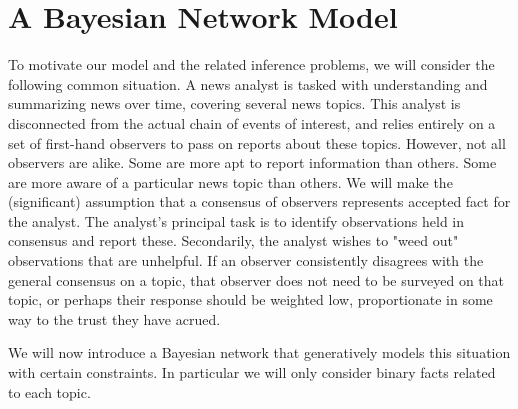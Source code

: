 \documentclass{amsart}
\theoremstyle{plain}
\numberwithin{equation}{section}
\begin{document}
\section{A Bayesian Network Model}

To motivate our model and the related inference problems, we will consider
the following common situation. A news analyst is tasked with understanding
and summarizing news over time, covering several news topics. This analyst
is disconnected from the actual chain of events of interest, and relies
entirely on a set of first-hand observers to pass on reports about these
topics. However, not all observers are alike. Some are more apt to report
information than others. Some are more aware of a particular news topic than
others. We will make the (significant) assumption that a consensus of
observers represents accepted fact for the analyst. The analyst's principal
task is to identify observations held in consensus and report these.
Secondarily, the analyst wishes to "weed out" observations that are
unhelpful. If an observer consistently disagrees with the general consensus
on a topic, that observer does not need to be surveyed on that topic, or
perhaps their response should be weighted low, proportionate in some way to
the trust they have acrued.

We will now introduce a Bayesian network that generatively models this
situation with certain constraints. In particular we will only consider
binary facts related to each topic.
\end{document}

